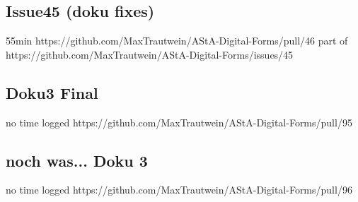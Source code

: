 \subsection{Issue45 (doku fixes)}
55min
https://github.com/MaxTrautwein/AStA-Digital-Forms/pull/46
part of https://github.com/MaxTrautwein/AStA-Digital-Forms/issues/45

\subsection{Doku3 Final}
no time logged
https://github.com/MaxTrautwein/AStA-Digital-Forms/pull/95

\subsection{noch was... Doku 3}
no time logged
https://github.com/MaxTrautwein/AStA-Digital-Forms/pull/96

